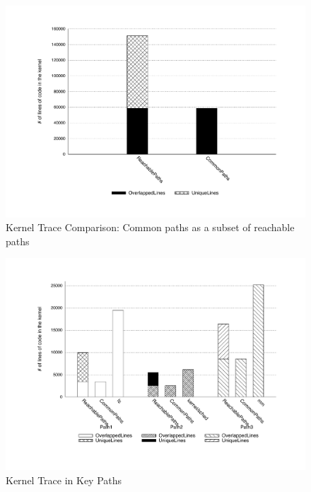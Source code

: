 \begin{figure}
	\centering
	\includegraphics[width=1.0\columnwidth]{diagram/lind_oakland16_diagram_01.pdf}
	\caption{Kernel Trace Comparison: Common paths as a subset of reachable paths}
	\label{fig:subset}
	\end{figure}

	\begin{figure}
	\centering
	\includegraphics[width=1.0\columnwidth]{diagram/lind_oakland16_diagram_02.pdf}
	\caption{Kernel Trace in Key Paths}
	\label{fig:key_paths_trace}
\end{figure}


